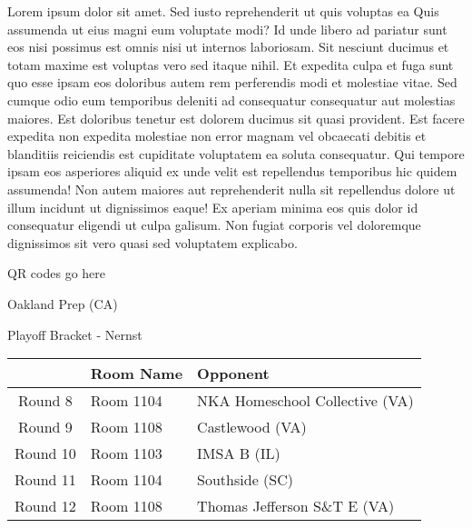 \documentclass{article}%
\begin{document}
\vspace*{8pt}%
\linebreak%
\newline%
\newline%
Lorem ipsum dolor sit amet. Sed iusto reprehenderit ut quis voluptas ea Quis assumenda ut eius magni eum voluptate modi? Id unde libero ad pariatur sunt eos nisi possimus est omnis nisi ut internos laboriosam. Sit nesciunt ducimus et totam maxime est voluptas vero sed itaque nihil. Et expedita culpa et fuga sunt quo esse ipsam eos doloribus autem rem perferendis modi et molestiae vitae.\newline%
\newline%
Sed cumque odio eum temporibus deleniti ad consequatur consequatur aut molestias maiores. Est doloribus tenetur est dolorem ducimus sit quasi provident. Est facere expedita non expedita molestiae non error magnam vel obcaecati debitis et blanditiis reiciendis est cupiditate voluptatem ea soluta consequatur. Qui tempore ipsam eos asperiores aliquid ex unde velit est repellendus temporibus hic quidem assumenda!\newline%
\newline%
Non autem maiores aut reprehenderit nulla sit repellendus dolore ut illum incidunt ut dignissimos eaque! Ex aperiam minima eos quis dolor id consequatur eligendi ut culpa galisum. Non fugiat corporis vel doloremque dignissimos sit vero quasi sed voluptatem explicabo.\newline%
\newline%
%
\vspace*{30pt}%
\begin{center}%
\begin{Huge}%
QR codes go here%
\end{Huge}%
\end{center}%
\newpage%
\begin{center}%
\begin{Huge}%
Oakland Prep (CA)%
\end{Huge}%
\vspace*{8pt}%
\linebreak%
\begin{Large}%
Playoff Bracket {-} Nernst%
\end{Large}%
\end{center}%
%
\begin{tabularx}{\textwidth}{|c|Y|Y|}%
\hline%
&Room Name&Opponent\\%
\hline%
Round 8&Room 1104&NKA Homeschool Collective (VA)\\%
Round 9&Room 1108&Castlewood (VA)\\%
Round 10&Room 1103&IMSA B (IL)\\%
Round 11&Room 1104&Southside (SC)\\%
Round 12&Room 1108&Thomas Jefferson S\&T E (VA)\\%
\hline%
\end{tabularx}%
\end{document}
